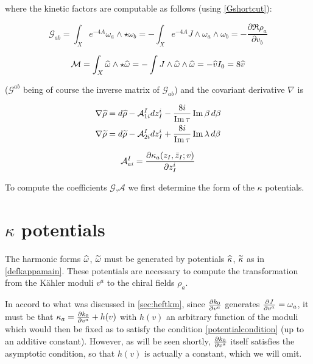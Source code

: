 where the kinetic factors are computable as follows (using \eqref{Gshortcut}):

\begin{equation}
	\mathcal{G}_{ab} = \int_X e^{-4A} \omega_a \wedge \star \omega_b = - \int_X e^{-4A} J \wedge \omega_a \wedge \omega_b = - \frac{\partial \Re \rho_a}{\partial v_b}
	\label{}
\end{equation}

\begin{equation}
	\mathcal{M} = \int_X \widehat{\omega} \wedge \star \widehat{\omega} = - \int J \wedge \widehat{\omega} \wedge \widehat{\omega} = - \widehat{v} I_0 = 8 \widehat{v}
	\label{Mfinal}
\end{equation}

($\mathcal G^{ab}$ being of course the inverse matrix of $\mathcal G_{ab}$) and the covariant derivative $\nabla$ is

\begin{align}
	\nabla \widehat{\rho} &= d \widehat{\rho} - \mathcal{A}_{1i}^{I} dz_I^i - \frac{8i}{\operatorname{Im} \tau} \operatorname{Im} \beta \, d\beta\\
	\nabla \widetilde{\rho} &= d \widetilde{\rho} - \mathcal{A}_{2i}^{I} dz_I^i + \frac{8i}{\operatorname{Im} \tau} \operatorname{Im} \lambda \, d\beta
	\label{}
\end{align}

\begin{equation}
	\mathcal{A}_{ai}^I = \frac{\partial\kappa_a(z_I,\bar z_I; v)}{\partial z_I^i}
	\label{}
\end{equation}

To compute the coefficients $\mathcal{G}$,$\mathcal{A}$ we first determine the form of the $\kappa$ potentials.

\section{$\kappa$ potentials}

The harmonic forms $\widehat{\omega}$, $\widetilde{\omega}$ must be generated by potentials $\widehat{\kappa}$, $\widetilde{\kappa}$ as in \eqref{defkappamain}. These potentials are necessary to compute the transformation from the K\"ahler moduli $v^a$ to the chiral fields $\rho_a$.

In accord to what was discussed in \ref{sec:heftkm}, since $\frac{\partial k_0}{\partial v^a}$ generates $\frac{\partial J}{\partial v^a} = \omega_a$, it must be that $\kappa_a = \frac{\partial k_0}{\partial v^a} + h(v)$ with $h(v)$ an arbitrary function of the moduli which would then be fixed as to satisfy the condition \eqref{potentialcondition} (up to an additive constant). However, as will be seen shortly, $\frac{\partial k_0}{\partial v^a}$ itself satisfies the asymptotic condition, so that $h(v)$ is actually a constant, which we will omit.\\


